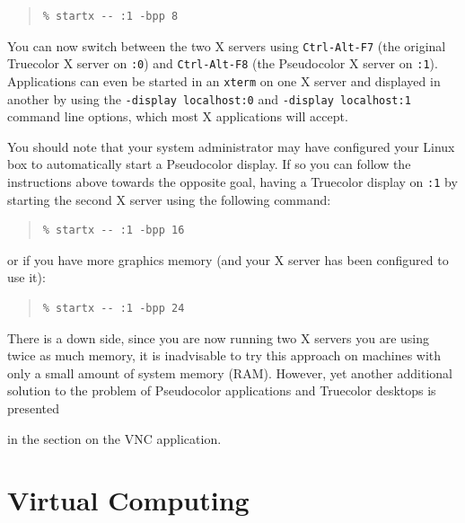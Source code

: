 \documentclass[twoside,11pt]{article}
\newcommand{\htmlref}[2]{#1}
\newcommand{\xlabel}[1]{}
\begin{document}
\small
\begin{quote}
\begin{verbatim}
% startx -- :1 -bpp 8
\end{verbatim}
\end{quote}
\normalsize

You can now switch between the two X servers using {\tt Ctrl-Alt-F7} (the original Truecolor X server on {\tt :0}) and {\tt Ctrl-Alt-F8} (the Pseudocolor X server on {\tt :1}). Applications can even be started in an {\tt xterm} on one X server and  displayed in another by using the {\tt -display localhost:0} and {\tt -display localhost:1} command line options, which most X applications will accept.

You should note that your system administrator may have configured your Linux box to automatically start a Pseudocolor display. If so you can follow the instructions above towards the opposite goal, having a Truecolor display on {\tt :1} by starting the second X server using the following command:

\small
\begin{quote}
\begin{verbatim}
% startx -- :1 -bpp 16
\end{verbatim}
\end{quote}
\normalsize

or if you have more graphics memory (and your X server has been configured to use it):

\small
\begin{quote}
\begin{verbatim}
% startx -- :1 -bpp 24
\end{verbatim}
\end{quote}
\normalsize

There is a down side, since you are now running two X servers you are using twice as much memory, it is inadvisable to try this approach on machines with only a small amount of system memory (RAM). However, yet another additional solution to the problem of Pseudocolor applications and Truecolor desktops is presented
\begin{htmlonly}
in the section on the \htmlref{VNC}{sc15_vnc} application.
\end{htmlonly}

\section{\xlabel{sc15_virtual}Virtual Computing\label{sc15_virtual}}
\end{document}
